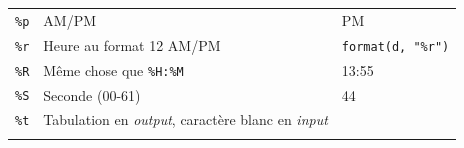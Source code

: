 \documentclass[
  11pt,
]{book}
\numberwithin{equation}{section}
\numberwithin{countremarque}{section}
\begin{document}
\begin{longtable}[]{@{}lll@{}}
\begin{minipage}[t]{0.20\columnwidth}
\texttt{\%p}\strut
\end{minipage} & \begin{minipage}[t]{0.42\columnwidth}\raggedright
AM/PM\strut
\end{minipage} & \begin{minipage}[t]{0.29\columnwidth}\raggedright
PM\strut
\end{minipage}\tabularnewline
\begin{minipage}[t]{0.20\columnwidth}\raggedright
\texttt{\%r}\strut
\end{minipage} & \begin{minipage}[t]{0.42\columnwidth}\raggedright
Heure au format 12 AM/PM\strut
\end{minipage} & \begin{minipage}[t]{0.29\columnwidth}\raggedright
\texttt{format(d,\ "\%r")}\strut
\end{minipage}\tabularnewline
\begin{minipage}[t]{0.20\columnwidth}\raggedright
\texttt{\%R}\strut
\end{minipage} & \begin{minipage}[t]{0.42\columnwidth}\raggedright
Même chose que \texttt{\%H:\%M}\strut
\end{minipage} & \begin{minipage}[t]{0.29\columnwidth}\raggedright
13:55\strut
\end{minipage}\tabularnewline
\begin{minipage}[t]{0.20\columnwidth}\raggedright
\texttt{\%S}\strut
\end{minipage} & \begin{minipage}[t]{0.42\columnwidth}\raggedright
Seconde (00-61)\strut
\end{minipage} & \begin{minipage}[t]{0.29\columnwidth}\raggedright
44\strut
\end{minipage}\tabularnewline
\begin{minipage}[t]{0.20\columnwidth}\raggedright
\texttt{\%t}\strut
\end{minipage} & \begin{minipage}[t]{0.42\columnwidth}\raggedright
Tabulation en \emph{output}, caractère blanc en \emph{input}\strut
\end{minipage} & \begin{minipage}[t]{0.29\columnwidth}\raggedright
\strut
\end{minipage}\tabularnewline
\begin{minipage}[t]{0.20\columnwidth}\raggedright

\end{minipage}
\end{longtable}
\end{document}
